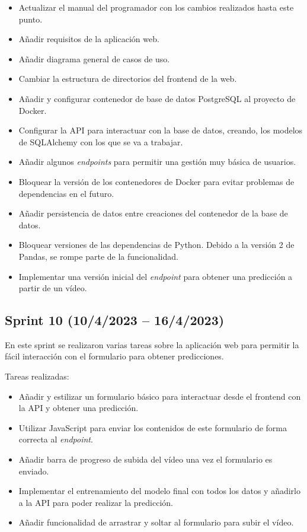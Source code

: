 \begin{itemize}
    \item Actualizar el manual del programador con los cambios realizados hasta
    este punto.
    \item Añadir requisitos de la aplicación web.
    \item Añadir diagrama general de casos de uso.
    \item Cambiar la estructura de directorios del frontend de la web.
    \item Añadir y configurar contenedor de base de datos PostgreSQL al proyecto
    de Docker.
    \item Configurar la API para interactuar con la base de datos, creando, los
    modelos de SQLAlchemy con los que se va a trabajar.
    \item Añadir algunos \textit{endpoints} para permitir una gestión muy básica de
    usuarios.
    \item Bloquear la versión de los contenedores de Docker para evitar
    problemas de dependencias en el futuro.
    \item Añadir persistencia de datos entre creaciones del contenedor de la
    base de datos.
    \item Bloquear versiones de las dependencias de Python. Debido a la versión
    2 de Pandas, se rompe parte de la funcionalidad.
    \item Implementar una versión inicial del \textit{endpoint} para obtener una
    predicción a partir de un vídeo.
\end{itemize}

\subsection{Sprint 10 (10/4/2023 -- 16/4/2023)}

En este sprint se realizaron varias tareas sobre la aplicación web para permitir
la fácil interacción con el formulario para obtener predicciones.

Tareas realizadas:

\begin{itemize}
    \item Añadir y estilizar un formulario básico para interactuar desde el
    frontend con la API y obtener una predicción.
    \item Utilizar JavaScript para enviar los contenidos de este formulario de
    forma correcta al \textit{endpoint}.
    \item Añadir barra de progreso de subida del vídeo una vez el formulario es
    enviado.
    \item Implementar el entrenamiento del modelo final con todos los datos y
    añadirlo a la API para poder realizar la predicción.
    \item Añadir funcionalidad de arrastrar y soltar al formulario para subir el
    vídeo.
\end{itemize}

